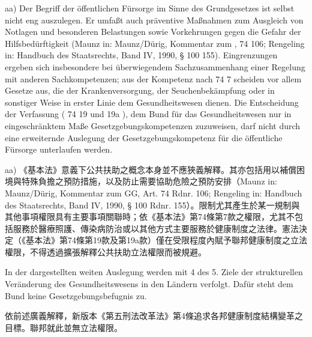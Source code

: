 \documentclass[12pt]{article}
\begin{document}
\begin{sourcepara}[title={原文E.240}]
aa) Der Begriff der öffentlichen Fürsorge im Sinne des Grundgesetzes ist selbst nicht eng auszulegen. Er umfaßt auch präventive Maßnahmen zum Ausgleich von Notlagen und besonderen Belastungen sowie Vorkehrungen gegen die Gefahr der Hilfsbedürftigkeit (Maunz in: Maunz/Dürig, Kommentar zum \abbrGG{}, \abbrArt{} 74 \abbrRdnr{} 106; Rengeling in: Handbuch des Staatsrechts, Band IV, 1990, § 100 \abbrRdnr{} 155). Eingrenzungen ergeben sich insbesondere bei überwiegendem Sachzusammenhang einer Regelung mit anderen Sachkompetenzen; aus der Kompetenz nach \abbrArt{} 74 \abbrNr{} 7 \abbrGG{}\ggfnArtSeventyFourSevenDE{} scheiden vor allem Gesetze aus, die der Krankenversorgung, der Seuchenbekämpfung oder in sonstiger Weise in erster Linie dem Gesundheitswesen dienen. Die Entscheidung der Verfassung (\abbrArt{} 74 \abbrNr{} 19 und 19a \abbrGG{}), dem Bund für das Gesundheitswesen nur in eingeschränktem Maße Gesetzgebungskompetenzen zuzuweisen, darf nicht durch eine erweiternde Auslegung der Gesetzgebungskompetenz für die öffentliche Fürsorge unterlaufen werden.
\end{sourcepara}
\begin{transpara}
aa) 《基本法》意義下公共扶助之概念本身並不應狹義解釋。其亦包括用以補償困境與特殊負擔之預防措施，以及防止需要協助危險之預防安排（Maunz in: Maunz/Dürig, Kommentar zum GG, Art. 74 Rdnr. 106; Rengeling in: Handbuch des Staatsrechts, Band IV, 1990, § 100 Rdnr. 155）。限制尤其產生於某一規制與其他事項權限具有主要事項關聯時；依《基本法》第74條第7款\ggfnArtSeventyFourSevenZH{}之權限，尤其不包括服務於醫療照護、傳染病防治或以其他方式主要服務於健康制度之法律。憲法決定（《基本法》第74條第19款及第19a款）僅在受限程度內賦予聯邦健康制度之立法權限，不得透過擴張解釋公共扶助立法權限而被規避。
\end{transpara}

\begin{sourcepara}[title={原文E.241}]
In der dargestellten weiten Auslegung werden mit \abbrArt{} 4 des 5. \abbrStrRG{} \abbrNF{} Ziele der strukturellen Veränderung des Gesundheitswesens in den Ländern verfolgt. Dafür steht dem Bund keine Gesetzgebungsbefugnis zu.
\end{sourcepara}
\begin{transpara}
依前述廣義解釋，新版本《第五刑法改革法》第4條追求各邦健康制度結構變革之目標。聯邦就此並無立法權限。
\end{transpara}
\end{document}
